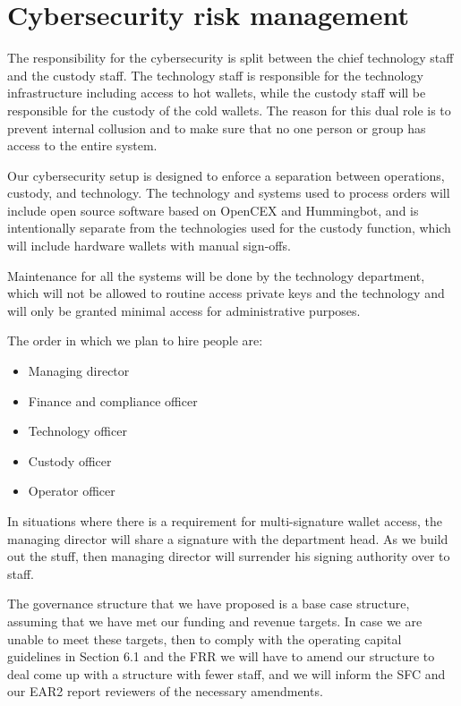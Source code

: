 \section{Cybersecurity risk management}

The responsibility for the cybersecurity is split between the chief
technology staff and the custody staff.  The technology staff is
responsible for the technology infrastructure including access to hot
wallets, while the custody staff will be responsible for the custody
of the cold wallets.  The reason for this dual role is to prevent
internal collusion and to make sure that no one person or group has
access to the entire system.

Our cybersecurity setup is designed to enforce a separation between
operations, custody, and technology.  The technology and systems used
to process orders will include open source software based on OpenCEX
and Hummingbot, and is intentionally separate from the technologies
used for the custody function, which will include hardware wallets with
manual sign-offs.

Maintenance for all the systems will be done by the technology
department, which will not be allowed to routine access private keys
and the technology and will only be granted minimal access for
administrative purposes.

The order in which we plan to hire people are:

\begin{itemize}
\item Managing director
\item Finance and compliance officer
\item Technology officer 
\item Custody officer
\item Operator officer
\end{itemize}

In situations where there is a requirement for multi-signature wallet
access, the managing director will share a signature with the
department head.  As we build out the stuff, then managing director
will surrender his signing authority over to staff.

The governance structure that we have proposed is a base case
structure, assuming that we have met our funding and revenue targets.
In case we are unable to meet these targets, then to comply with the
operating capital guidelines in Section 6.1 and the FRR we will have
to amend our structure to deal come up with a structure with fewer
staff, and we will inform the SFC and our EAR2 report reviewers of the
necessary amendments.

